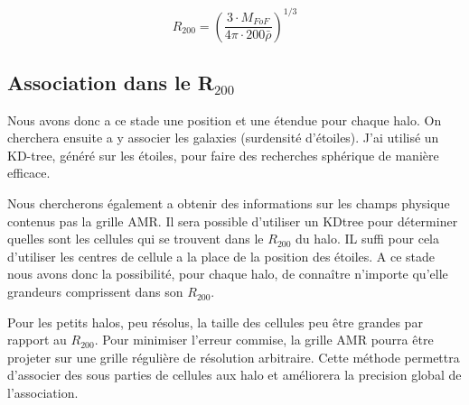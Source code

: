 \begin{equation}
R_{200}= \left( \frac{3\cdot M_{FoF} }{4\pi\cdot 200 \bar{\rho}} \right)^{1/3}
\end{equation}


\subsection{Association dans le R$_{200}$}



%

Nous avons donc a ce stade une position et une étendue pour chaque halo.
On cherchera ensuite a y associer les galaxies (surdensité d'étoiles).
J'ai utilisé un KD-tree, généré sur les étoiles, pour faire des recherches sphérique de manière efficace.

Nous chercherons également a obtenir des informations sur les champs physique contenus pas la grille AMR.
Il sera possible d'utiliser un KDtree pour déterminer quelles sont les cellules qui se trouvent dans le $R_{200}$ du halo.
IL suffi pour cela d'utiliser les centres de cellule a la place de la position des étoiles.
A ce stade nous avons donc la possibilité, pour chaque halo, de connaître n'importe qu'elle grandeurs comprissent dans son $R_{200}$.

Pour les petits halos, peu résolus, la taille des cellules peu être grandes par rapport au $R_{200}$.
Pour minimiser l'erreur commise, la grille AMR pourra être projeter sur une grille régulière de résolution arbitraire.
Cette méthode permettra d'associer des sous parties de cellules aux halo et améliorera la precision global de l'association.

